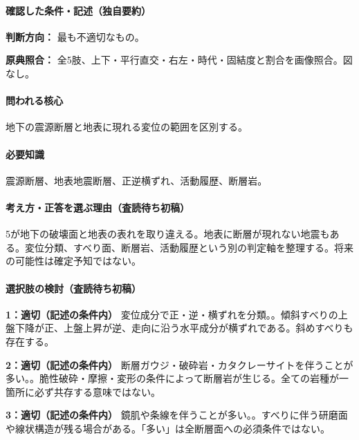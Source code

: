 \paragraph{確認した条件・記述（独自要約）}\mbox{}\par

\noindent\textbf{判断方向：} 最も不適切なもの。\par

\noindent\textbf{原典照合：} 全5肢、上下・平行直交・右左・時代・固結度と割合を画像照合。図なし。\par

\paragraph{問われる核心} 地下の震源断層と地表に現れる変位の範囲を区別する。

\paragraph{必要知識} 震源断層、地表地震断層、正逆横ずれ、活動履歴、断層岩。

\paragraph{考え方・正答を選ぶ理由（査読待ち初稿）} 5が地下の破壊面と地表の表れを取り違える。地表に断層が現れない地震もある。変位分類、すべり面、断層岩、活動履歴という別の判定軸を整理する。将来の可能性は確定予知ではない。

\paragraph{選択肢の検討（査読待ち初稿）}\mbox{}\par

\noindent\textbf{1：適切（記述の条件内）} 変位成分で正・逆・横ずれを分類。。傾斜すべりの上盤下降が正、上盤上昇が逆、走向に沿う水平成分が横ずれである。斜めすべりも存在する。\par

\noindent\textbf{2：適切（記述の条件内）} 断層ガウジ・破砕岩・カタクレーサイトを伴うことが多い。。脆性破砕・摩擦・変形の条件によって断層岩が生じる。全ての岩種が一箇所に必ず共存する意味ではない。\par

\noindent\textbf{3：適切（記述の条件内）} 鏡肌や条線を伴うことが多い。。すべりに伴う研磨面や線状構造が残る場合がある。「多い」は全断層面への必須条件ではない。\par

